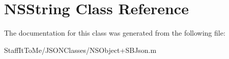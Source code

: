\hypertarget{class_n_s_string}{
\section{\-N\-S\-String \-Class \-Reference}
\label{class_n_s_string}
}


\-The documentation for this class was generated from the following file\-:\begin{DoxyCompactItemize}
\item 
\-Staff\-It\-To\-Me/\-J\-S\-O\-N\-Classes/\-N\-S\-Object+\-S\-B\-Json.\-m\end{DoxyCompactItemize}
